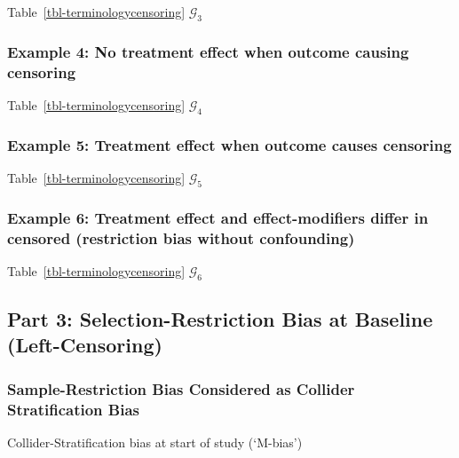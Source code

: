 \documentclass[
  single column]{article}
\begin{document}
Table~\ref{tbl-terminologycensoring} \(\mathcal{G}_3\)

\subsubsection{Example 4: No treatment effect when outcome causing
censoring}\label{example-4-no-treatment-effect-when-outcome-causing-censoring}

Table~\ref{tbl-terminologycensoring} \(\mathcal{G}_4\)

\subsubsection{Example 5: Treatment effect when outcome causes
censoring}\label{example-5-treatment-effect-when-outcome-causes-censoring}

Table~\ref{tbl-terminologycensoring} \(\mathcal{G}_5\)

\subsubsection{Example 6: Treatment effect and effect-modifiers differ
in censored (restriction bias without
confounding)}\label{example-6-treatment-effect-and-effect-modifiers-differ-in-censored-restriction-bias-without-confounding}

Table~\ref{tbl-terminologycensoring} \(\mathcal{G}_6\)

\subsection{Part 3: Selection-Restriction Bias at Baseline
(Left-Censoring)}\label{part-3-selection-restriction-bias-at-baseline-left-censoring}

\subsubsection{Sample-Restriction Bias Considered as Collider
Stratification
Bias}\label{sample-restriction-bias-considered-as-collider-stratification-bias}

\begin{table}

\caption{\label{tbl-terminologyselectionrestrictionclassic}Collider-Stratification
bias at start of study (`M-bias')}

\centering{

\terminologyselectionrestrictionclassic

}

\end{table}%
\end{document}
